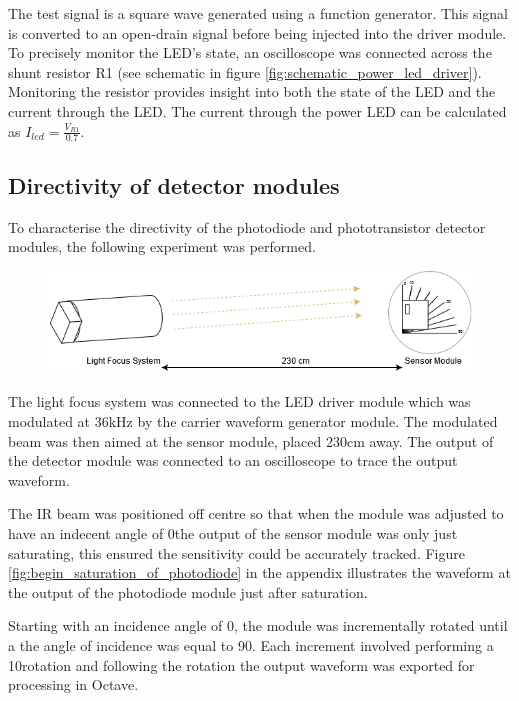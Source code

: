 The test signal is a square wave generated using a function generator. This signal is converted to an open-drain signal before being injected into the driver module. To precisely monitor the LED's state, an oscilloscope was connected across the shunt resistor R1 (see schematic in figure \ref{fig:schematic_power_led_driver}). Monitoring the resistor provides insight into both the state of the LED and the current through the LED. The current through the power LED can be calculated as \(I_{led} = \frac{V_{R1}}{0.7}\).


\subsection{Directivity of detector modules}

To characterise the directivity of the photodiode and phototransistor detector modules, the following experiment was performed.

\begin{figure}[H]
	\centering
	\includegraphics[width=.9\linewidth]{figures/experimentation/beam_angle_of_receiver.png}
	\label{fig:directivity_experiement_setup}
\end{figure}

The light focus system was connected to the LED driver module which was modulated at 36kHz by the carrier waveform generator module. The modulated beam was then aimed at the sensor module, placed 230cm away. The output of the detector module was connected to an oscilloscope to trace the output waveform.

The IR beam was positioned off centre so that when the module was adjusted to have an indecent angle of 0\textdegree the output of the sensor module was only just saturating, this ensured the sensitivity could be accurately tracked. Figure \ref{fig:begin_saturation_of_photodiode} in the appendix illustrates the waveform at the output of the photodiode module just after saturation.

Starting with an incidence angle of 0\textdegree, the module was incrementally rotated until a the angle of incidence was equal to 90\textdegree. Each increment involved performing a 10\textdegree rotation and following the rotation the output waveform was exported for processing in Octave.

